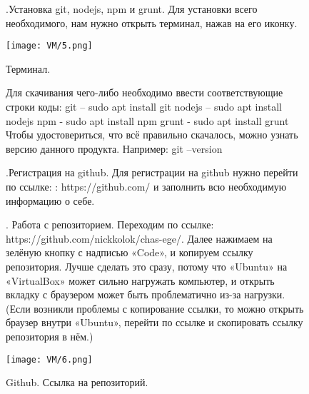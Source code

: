 
\begin{figure}
.\quad Установка git, nodejs, npm и grunt.
\newline Для установки всего необходимого, нам нужно открыть терминал, нажав на его иконку.  
		
		\centering
		\texttt{[image: VM/5.png]}
\caption{Терминал.}
\label{ris:image}
\end{figure}

\begin{figure}
\quad Для скачивания чего-либо необходимо ввести соответствующие строки коды:
\newline git – sudo apt install git
\newline nodejs – sudo apt install nodejs
\newline npm - sudo apt install npm
\newline grunt - sudo apt install grunt
\newline Чтобы удостовериться, что всё правильно скачалось, можно узнать версию данного продукта. Например: git –version
\end{figure}

\begin{figure}
.\quad  Регистрация на github.
\newline \quad Для регистрации на github нужно перейти по ссылке: : https://github.com/ и заполнить всю необходимую информацию о себе.
\end{figure}

\begin{figure}
. \quad Работа с репозиторием.
\newline \quad Переходим по ссылке: https://github.com/nickkolok/chas-ege/. Далее нажимаем на зелёную кнопку с надписью «Code», и копируем ссылку репозитория. Лучше сделать это сразу, потому что «Ubuntu» на «VirtualBox» может сильно нагружать компьютер, и открыть вкладку с браузером может быть проблематично из-за нагрузки. (Если возникли проблемы с копирование ссылки, то можно открыть браузер внутри «Ubuntu», перейти по ссылке и скопировать ссылку репозитория в нём.)

		\centering
		\texttt{[image: VM/6.png]}
\caption{Github. Ссылка на репозиторий.}
\label{ris:image}
\end{figure}

